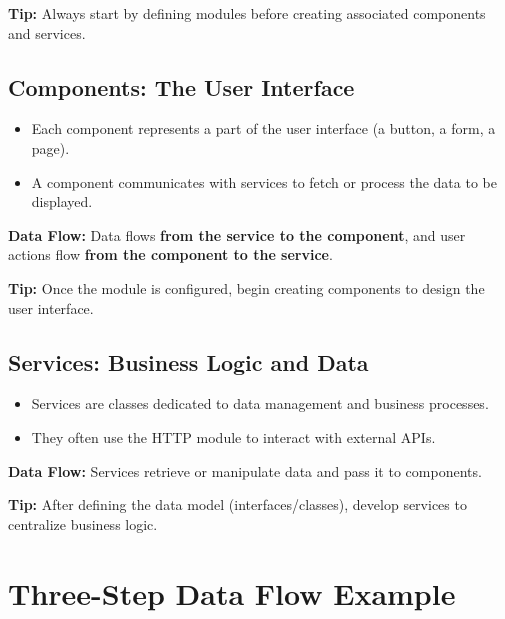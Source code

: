 \documentclass{article}
\begin{document}
\textbf{Tip:} Always start by defining modules before creating associated components and services.

\subsection{Components: The User Interface}
\begin{itemize}
    \item Each component represents a part of the user interface (a button, a form, a page).
    \item A component communicates with services to fetch or process the data to be displayed.
\end{itemize}

\textbf{Data Flow:}  
Data flows \textbf{from the service to the component}, and user actions flow \textbf{from the component to the service}.

\textbf{Tip:} Once the module is configured, begin creating components to design the user interface.

\subsection{Services: Business Logic and Data}
\begin{itemize}
    \item Services are classes dedicated to data management and business processes.
    \item They often use the HTTP module to interact with external APIs.
\end{itemize}

\textbf{Data Flow:}  
Services retrieve or manipulate data and pass it to components.

\textbf{Tip:} After defining the data model (interfaces/classes), develop services to centralize business logic.

\section{Three-Step Data Flow Example}
\end{document}
